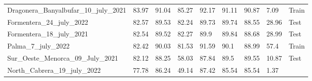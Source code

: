 \begin{table}[H]
{\begin{tabular}{lllllllll}
            \\
            Dragonera\_Banyalbufar\_10\_july\_2021 & 83.97               &
            91.04
                                                   & 85.27               &
            92.17
                                                   & 91.11               &
            90.87
                                                   & 7.09                &
            {\color[HTML]{66c2a5} Train}
            \\
            Formentera\_24\_july\_2022             & 82.57               &
            89.53
                                                   & 82.24               &
            89.73
                                                   & 89.74               &
            88.55
                                                   & 28.96               &
            {\color[HTML]{fc8d62} Test}
            \\
            Formentera\_18\_july\_2021             & 82.54               &
            89.52
                                                   & 82.27               & 89.9
                                                   & 89.84               &
            88.68
                                                   & 28.99               &
            {\color[HTML]{fc8d62} Test}
            \\
            Palma\_7\_july\_2022                   & 82.42               &
            90.03
                                                   & 81.53               &
            91.59
                                                   & 90.1                &
            88.99
                                                   & 57.4                &
            {\color[HTML]{66c2a5} Train}
            \\
            Sur\_Oeste\_Menorca\_09\_July\_2021    & 82.12               &
            88.25
                                                   & 58.03               &
            87.84
                                                   & 89.5                &
            89.55
                                                   & 10.87               &
            {\color[HTML]{fc8d62} Test}
            \\
            North\_Cabrera\_19\_july\_2022         & 77.78               &
            86.24
                                                   & 49.14               &
            87.42
                                                   & 85.54               &
            85.54
                                                   & 1.37                &

\end{tabular}}
\end{table}
